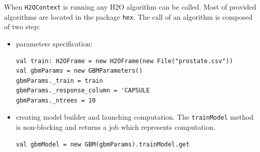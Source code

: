 When \texttt{H2OContext} is running any H2O algorithm can be called. Most of provided algorithms are located in the package \texttt{hex}. The call of an algorithm is composed of two step:

\begin{itemize}
	\item parameters specification:
\begin{lstlisting}[style=Scala]
val train: H2OFrame = new H2OFrame(new File("prostate.csv"))
val gbmParams = new GBMParameters()
gbmParams._train = train
gbmParams._response_column = 'CAPSULE
gbmParams._ntrees = 10
\end{lstlisting}

	\item creating model builder and launching computation. The \texttt{trainModel} method is non-blocking and returns a job which represents computation.
\begin{lstlisting}[style=Scala]
val gbmModel = new GBM(gbmParams).trainModel.get
\end{lstlisting}
\end{itemize}


